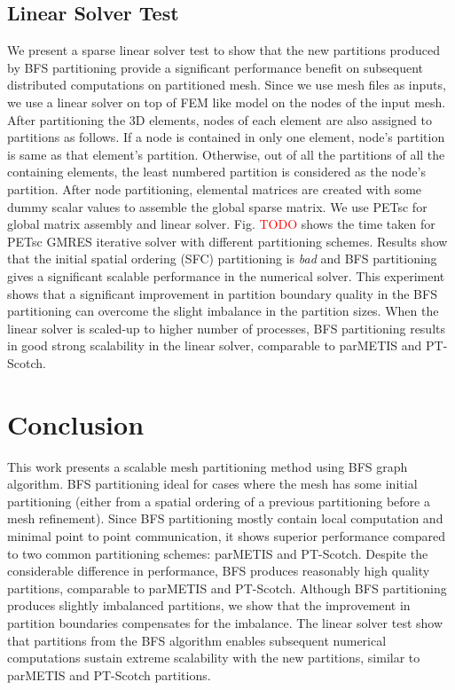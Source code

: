 \documentclass[conference]{IEEEtran}
\begin{document}
\subsection{Linear Solver Test}
We present a sparse linear solver test to show that the new partitions produced by BFS partitioning provide a significant performance benefit on subsequent distributed computations on partitioned mesh. Since we use mesh files as inputs, we use a linear solver on top of FEM like model on the nodes of the input mesh. After partitioning the 3D elements, nodes of each element are also assigned to partitions as follows. If a node is contained in only one element, node's partition is same as that element's partition. Otherwise, out of all the partitions of all the containing elements, the least numbered partition is considered as the node's partition. After node partitioning, elemental matrices are created with some dummy scalar values to assemble the global sparse matrix. We use PETsc \cite{petsc-web-page} for global matrix assembly and linear solver. Fig. \textcolor{red}{TODO} shows the time taken for PETsc GMRES \cite{GMRES} iterative solver with different partitioning schemes. Results show that the initial spatial ordering (SFC) partitioning is \emph{bad} and BFS partitioning gives a significant scalable performance in the numerical solver. This experiment shows that a significant improvement in partition boundary quality in the BFS partitioning can overcome the slight imbalance in the partition sizes. When the linear solver is scaled-up to higher number of processes, BFS partitioning results in good strong scalability in the linear solver, comparable to parMETIS and PT-Scotch. 

\section{Conclusion}
This work presents a scalable mesh partitioning method using BFS graph algorithm. BFS partitioning ideal for cases where the mesh has some initial partitioning (either from a spatial ordering of a previous partitioning before a mesh refinement). Since BFS partitioning mostly contain local computation and minimal point to point communication, it shows superior performance compared to two common partitioning schemes: parMETIS and PT-Scotch. Despite the considerable difference in performance, BFS produces reasonably high quality partitions, comparable to parMETIS and PT-Scotch. Although BFS partitioning produces slightly imbalanced partitions, we show that the improvement in partition boundaries compensates for the imbalance. The linear solver test show that partitions from the BFS algorithm enables subsequent numerical computations sustain extreme scalability with the new partitions, similar to parMETIS and PT-Scotch partitions. 
\end{document}
